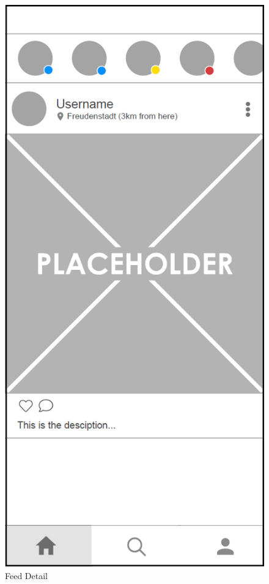 \begin{figure}[H]
    \centering
    \begin{minipage}{.5\textwidth}
      \centering
      \includegraphics[width=.8\linewidth]{images/Feed_Detail_MockUp.png}
      \caption{Feed Detail}
      \label{fig:feed_detail}
    \end{minipage}%
    \begin{minipage}{.5\textwidth}
      \centering

\end{minipage}
\end{figure}
